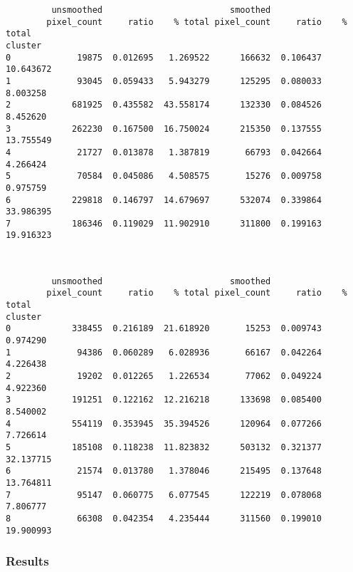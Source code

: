\documentclass[11pt]{article}
\begin{document}
    
    \begin{verbatim}
         unsmoothed                         smoothed                     
        pixel_count     ratio    % total pixel_count     ratio    % total
cluster                                                                  
0             19875  0.012695   1.269522      166632  0.106437  10.643672
1             93045  0.059433   5.943279      125295  0.080033   8.003258
2            681925  0.435582  43.558174      132330  0.084526   8.452620
3            262230  0.167500  16.750024      215350  0.137555  13.755549
4             21727  0.013878   1.387819       66793  0.042664   4.266424
5             70584  0.045086   4.508575       15276  0.009758   0.975759
6            229818  0.146797  14.679697      532074  0.339864  33.986395
7            186346  0.119029  11.902910      311800  0.199163  19.916323
    \end{verbatim}

    
    \begin{center}
    \end{center}
    { \hspace*{\fill} \\}
    
    
    \begin{verbatim}
         unsmoothed                         smoothed                     
        pixel_count     ratio    % total pixel_count     ratio    % total
cluster                                                                  
0            338455  0.216189  21.618920       15253  0.009743   0.974290
1             94386  0.060289   6.028936       66167  0.042264   4.226438
2             19202  0.012265   1.226534       77062  0.049224   4.922360
3            191251  0.122162  12.216218      133698  0.085400   8.540002
4            554119  0.353945  35.394526      120964  0.077266   7.726614
5            185108  0.118238  11.823832      503132  0.321377  32.137715
6             21574  0.013780   1.378046      215495  0.137648  13.764811
7             95147  0.060775   6.077545      122219  0.078068   7.806777
8             66308  0.042354   4.235444      311560  0.199010  19.900993
    \end{verbatim}

    
    \subsubsection{Results}\label{results}
\end{document}
